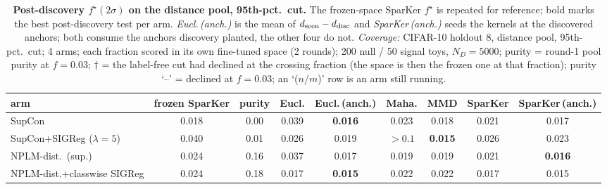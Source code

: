 \begin{table}[t]
\centering
\footnotesize
\begin{tabular}{lcccccccc}
\toprule
arm & frozen SparKer & purity & Eucl. & Eucl.\,(anch.) & Maha. & MMD & SparKer & SparKer\,(anch.) \\
\midrule
SupCon & 0.018 & 0.00 & 0.039 & \textbf{0.016} & 0.023 & 0.018 & 0.021 & 0.017 \\
\addlinespace
SupCon+SIGReg ($\lambda{=}5$) & 0.040 & 0.01 & 0.026 & 0.019 & $>0.1$ & \textbf{0.015} & 0.026 & 0.023 \\
\addlinespace
NPLM-dist.\ (sup.) & 0.024 & 0.16 & 0.037 & 0.017 & 0.019 & 0.019 & 0.021 & \textbf{0.016} \\
\addlinespace
NPLM-dist.+classwise SIGReg & 0.024 & 0.18 & 0.017 & \textbf{0.015} & 0.022 & 0.022 & 0.017 & 0.015 \\
\bottomrule
\end{tabular}
\caption{\textbf{Post-discovery $f^\star(2\sigma)$ on the distance pool, 95th-pct.\ cut.} The frozen-space SparKer $f^\star$ is repeated for reference; bold marks the best post-discovery test per arm. \emph{Eucl.\,(anch.)} is the mean of $d_{\rm seen}-d_{\rm disc}$ and \emph{SparKer\,(anch.)} seeds the kernels at the discovered anchors; both consume the anchors discovery planted, the other four do not. \emph{Coverage:} CIFAR-10 holdout 8, distance pool, 95th-pct.\ cut; 4 arms; each fraction scored in its own fine-tuned space (2 rounds); 200 null / 50 signal toys, $N_D{=}5000$; purity = round-1 pool purity at $f{=}0.03$; $\dagger$ = the label-free cut had declined at the crossing fraction (the space is then the frozen one at that fraction); purity `--' = declined at $f{=}0.03$; an `($n$/$m$)' row is an arm still running.}
\label{tab:sigma_post_cifar10_h8_quantile}
\end{table}
